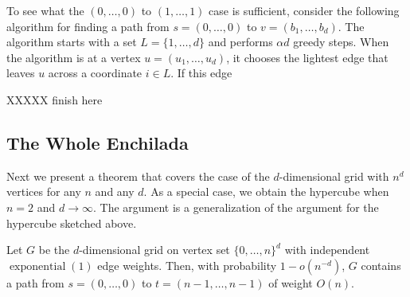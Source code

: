 \documentclass[lotsofwhite]{patmorin}
\DeclareMathOperator{\exponential}{exponential}
\begin{document}
To see what the $(0,\ldots,0)$ to $(1,\ldots,1)$ case is
sufficient, consider the following algorithm for finding a path from
$s=(0,\ldots,0)$ to $v=(b_1,\ldots,b_d)$.  The algorithm starts with a
set $L=\{1,\ldots,d\}$ and performs $\alpha d$ greedy steps.  When the
algorithm is at a vertex $u=(u_1,\ldots,u_d)$, it chooses the lightest
edge that leaves $u$ across a coordinate $i\in L$.  If this edge

XXXXX finish here

\subsection{The Whole Enchilada}

Next we present a theorem that covers the case of the $d$-dimensional
grid with $n^d$ vertices for any $n$ and any $d$.  As a special case,
we obtain the hypercube when $n=2$ and $d\to\infty$.   The argument is a generalization of the argument for the hypercube sketched above.

\begin{lem}
   Let $G$ be the $d$-dimensional grid on vertex set $\{0,\ldots,n\}^d$
   with independent $\exponential(1)$ edge weights. Then, with
   probability $1-o(n^{-d})$, $G$ contains a path from $s=(0,\ldots,0)$
   to $t=(n-1,\ldots,n-1)$ of weight $O(n)$.
\end{lem}
\end{document}
